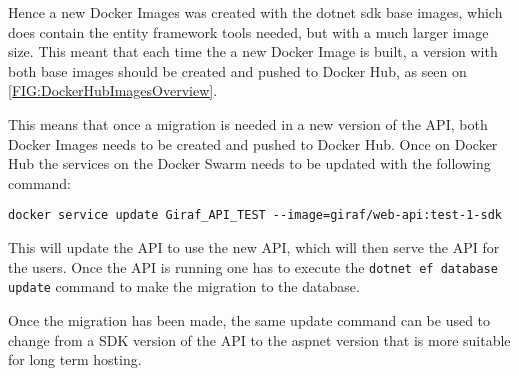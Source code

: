 Hence a new Docker Images was created with the dotnet sdk base images, which does contain the entity framework tools needed, but with a much larger image size. 
This meant that each time the a new Docker Image is built, a version with both base images should be created and pushed to Docker Hub, as seen on \autoref{FIG:DockerHubImagesOverview}. 


This means that once a migration is needed in a new version of the API, both Docker Images needs to be created and pushed to Docker Hub. 
Once on Docker Hub the services on the Docker Swarm needs to be updated with the following command:

\lstinline$docker service update Giraf_API_TEST --image=giraf/web-api:test-1-sdk$

This will update the API to use the new API, which will then serve the API for the users.
Once the API is running one has to execute the \lstinline$dotnet ef database update$ command to make the migration to the database.

Once the migration has been made, the same update command can be used to change from a SDK version of the API to the aspnet version that is more suitable for long term hosting.




